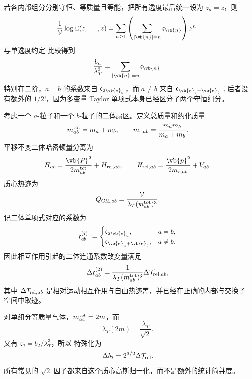 若各内部组分分别守恒、等质量且等能，把所有逸度最后统一设为 \(z_a=z\)，则
\[
 \frac1{\mathcal V}\log\Xi(z,\ldots,z)
 =\sum_{n\ge1}
 \left(\sum_{|\vb{n}|=n}\mathfrak c_{\vb{n}}\right)z^n.
\]
与单逸度约定  比较得到
\begin{equation}
 \frac{b_n}{\lambda_T^3}
 =\sum_{|\vb{n}|=n}\mathfrak c_{\vb{n}}.
 \label{eq:phys-sm-multicomponent-to-single}
\end{equation}
特别在二阶，\(a=b\) 的系数来自 \(\mathfrak c_{2\vb{e}_a}\)，而 \(a\neq b\) 来自 \(\mathfrak c_{\vb{e}_a+\vb{e}_b}\)；后者没有额外的 \(1/2!\)，因为多变量 Taylor 单项式本身已经区分了两个守恒组分。

考虑一个 \(a\)-粒子和一个 \(b\)-粒子的二体扇区。定义总质量和约化质量
\begin{equation}
 m_{ab}^{\rm tot}=m_a+m_b,
 \qquad
 m_{r,ab}=\frac{m_am_b}{m_a+m_b}.
 \label{eq:phys-sm-two-body-masses}
\end{equation}
平移不变二体哈密顿量分离为
\begin{equation}
 H_{ab}
 =\frac{\vb{P}^2}{2m_{ab}^{\rm tot}}
 +H_{{\rm rel},ab},
 \qquad
 H_{{\rm rel},ab}
 =\frac{\vb{p}^2}{2m_{r,ab}}+V_{ab}.
 \label{eq:phys-sm-two-body-separation}
\end{equation}
质心热迹为
\begin{equation}
 Q_{{\rm CM},ab}
 =\frac{\mathcal V}
 {\lambda_T(m_{ab}^{\rm tot})^3}.
 \label{eq:phys-sm-qcm}
\end{equation}
记二体单项式对应的系数为
\[
 \mathfrak c_{ab}^{(2)}:=
 \begin{cases}
 \mathfrak c_{2\vb{e}_a},&a=b,\\
 \mathfrak c_{\vb{e}_a+\vb{e}_b},&a\neq b.
 \end{cases}
\]
因此相互作用引起的二体连通系数改变量满足
\begin{equation}
 \Delta\mathfrak c_{ab}^{(2)}
 =\frac{1}{\lambda_T(m_{ab}^{\rm tot})^3}
 \Delta\mathcal T_{{\rm rel},ab},
 \label{eq:phys-sm-multicomponent-bu-prefactor}
\end{equation}
其中 \(\Delta\mathcal T_{{\rm rel},ab}\) 是相对运动相互作用与自由热迹差，并已经在正确的内部与交换子空间中取迹。

对单组分等质量气体，\(m_{aa}^{\rm tot}=2m\)，而
\[
 \lambda_T(2m)=\frac{\lambda_T}{\sqrt2}.
\]
又有 \(\mathfrak c_2=b_2/\lambda_T^3\)，所以 特殊化为
\begin{equation}
 \Delta b_2
 =2^{3/2}\Delta\mathcal T_{\rm rel}.
 \label{eq:phys-sm-delta-b2-delta-q2}
\end{equation}
所有常见的 \(\sqrt2\) 因子都来自这个质心高斯归一化，而不是额外的统计简并度。
